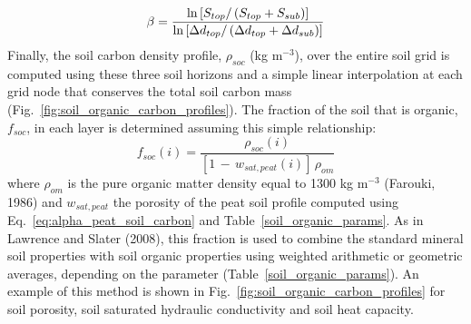 \begin{equation}
%
\beta = \frac
{{\rm ln}\left[ 
S_{top}/\left( S_{top} + S_{sub}\right)
\right]}
{{\rm ln}\left[ 
\Delta d_{top}/\left( \Delta d_{top} + \Delta d_{sub}\right)
\right]}
%
\end{equation}
%
Finally, the soil carbon density profile, $\rho_{soc}$ (kg m$^{-3}$), 
over the
entire soil grid is computed using these three soil horizons and a
simple linear interpolation at each grid node that conserves the total
soil carbon mass 
(Fig.~\ref{fig:soil_organic_carbon_profiles}). 
The fraction of the soil that is organic,
$f_{soc}$, in each layer is determined assuming this simple
relationship:
%
\begin{equation}
\label{eq:frac_soc_soil_carbon}
%
f_{soc}(i) = \frac
{\rho_{soc}(i)}
{\left[ 1 \,-\, w_{sat,peat}(i) \right]\, \rho_{om}}
%
\end{equation}
%
where $\rho_{om}$ is the pure organic matter density equal 
to 1300 kg m$^{-3}$ (Farouki, 1986)\nocite{farouki1986} and $w_{sat,peat}$ 
the porosity of the peat soil
profile computed using 
Eq.~\ref{eq:alpha_peat_soil_carbon}
and Table~\ref{soil_organic_params}. 
As in Lawrence and Slater (2008)\nocite{Lawrence_Slater_2008}, 
this fraction is used to combine the standard mineral
soil properties with soil organic properties using weighted arithmetic
or geometric averages, depending on the parameter 
(Table~\ref{soil_organic_params}). 
An example of this method is shown in Fig.~\ref{fig:soil_organic_carbon_profiles}
for soil porosity, soil
saturated hydraulic conductivity and soil heat capacity.


